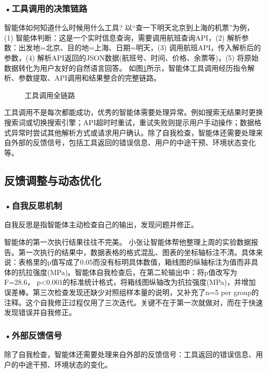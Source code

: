 \subsubsection*{\textbf{•工具调用的决策链路}}
智能体如何知道什么时候用什么工具?
以“查一下明天北京到上海的机票”为例，
(1) 智能体判断：这是一个实时信息查询，需要调用航班查询API，(2) 解析参数：出发地=北京、目的地=上海、日期=明天，(3) 调用航班API，传入解析后的参数，(4) 解析API返回的JSON数据(航班号、时间、价格、余票等)，(5) 将原始数据转化为用户友好的自然语言回答。 如图\ref{fig:ch3_3_26}所示，智能体工具调用经历指令解析、参数提取、API调用和结果整合的完整链路。

\begin{figure}[H]
\centering
{}
\caption{工具调用全链路}
\label{fig:ch3_3_26}
\end{figure}


工具调用不是每次都能成功，优秀的智能体需要处理异常。例如搜索无结果时更换搜索词或切换搜索引擎；API超时时重试，重试失败则提示用户手动操作；数据格式异常时尝试其他解析方式或请求用户确认。除了自我检查，智能体还需要处理来自外部的反馈信号，包括工具返回的错误信息、用户的中途干预、环境状态变化等。

\subsection{反馈调整与动态优化}



\subsubsection*{\textbf{•自我反思机制}}
自我反思是指智能体主动检查自己的输出，发现问题并修正。

智能体的第一次执行结果往往不完美。 小张让智能体帮他整理上周的实验数据报告。第一次执行的结果中，数据表格的格式混乱、图表的坐标轴标注不清。具体来说：表格里的p值写成了0.05而没有标明具体数值，箱线图的纵轴标注为值而非具体的抗拉强度(MPa)。智能体自我检查后，在第二轮输出中：将p值改写为F=28.6， p<0.001的标准统计格式，将箱线图纵轴改为抗拉强度(MPa)，并增加误差棒。第三次检查发现还缺少对照组样本量的说明，又补充了n=5 per group的注释。这个自我修正过程仅用了三次迭代。关键不在于第一次就做对，而在于快速发现错误并自我修正。




\subsubsection*{\textbf{•外部反馈信号}}
除了自我检查，智能体还需要处理来自外部的反馈信号：工具返回的错误信息、用户的中途干预、环境状态的变化。 

